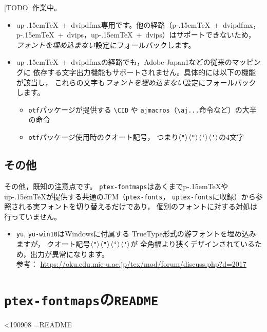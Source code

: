 \documentclass{jlreq}
\makeatletter
\def\loadprint#1{%
  \openin\xx@myread=#1\relax
  \@whilesw\unless\ifeof\xx@myread\fi{%
    \readline\xx@myread to \xx@dataline
    \expandafter\xx@striplf\xx@dataline\@nil
    \leavevmode\null\xx@dataline\par
  }%
  \closein\xx@myread
}
\def\file#1{\texttt{#1}}
\def\command#1{\texttt{#1}}
\def\codechar#1{\ensuremath{\langle\mbox{\texttt{#1}}\rangle}}
\def\pTeX{p\kern-.15em\TeX}
\def\upTeX{u\pTeX}
\makeatother
\begin{document}
[TODO] 作業中。

\begin{itemize}
  \item \upTeX~+~dvipdfmx専用です。他の経路（\pTeX~+~dvipdfmx，
        \pTeX~+~dvips，\upTeX~+~dvips）はサポートできないため，
        \emph{フォントを埋め込まない}設定にフォールバックします。
  \item \upTeX~+~dvipdfmxの経路でも，Adobe-Japan1などの従来のマッピングに
        依存する文字出力機能もサポートされません。具体的には以下の機能が該当し，
        これらの文字も\emph{フォントを埋め込まない}設定にフォールバックします。
    \begin{itemize}
      \item \file{otf}パッケージが提供する \verb+\CID+ や
            \file{ajmacros}（\verb+\aj...+命令など）の大半の命令
      \item \file{otf}パッケージ使用時のクオート記号，
            つまり\codechar{“}\codechar{”}\codechar{‘}\codechar{’}の4文字
    \end{itemize}
\end{itemize}

\subsection{その他}

その他，既知の注意点です。
\file{ptex-fontmaps}はあくまで\pTeX や\upTeX が提供する共通のJFM（\file{ptex-fonts}，
\file{uptex-fonts}に収録）から参照される実フォントを切り替えるだけであり，
個別のフォントに対する対処は行っていません。

\begin{itemize}
  \item \command{yu}, \command{yu-win10}はWindowsに付属する
        TrueType形式の游フォントを埋め込みますが，
        クオート記号\codechar{“}\codechar{”}\codechar{‘}\codechar{’}が
        全角幅より狭くデザインされているため，出力が異常になります。\\
        参考： \url{https://oku.edu.mie-u.ac.jp/tex/mod/forum/discuss.php?d=2017}
\end{itemize}





\clearpage
\appendix


\section{\file{ptex-fontmaps}の\file{README}}

\ifnum\epTeXversion<190908\relax
\else
  {\frenchspacing\ttfamily\footnotesize\loadprint{README}}
\fi
\end{document}
